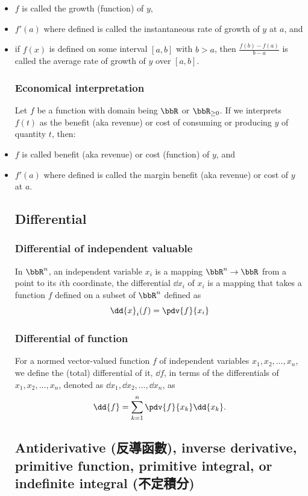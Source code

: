 \documentclass[a4paper,12pt]{report}
\begin{document}
\begin{itemize}
\begin{itemize}
\subsubsection{Biological interpretation}
Let $f$ be a function with domain being $\bbR$ or $\bbR_{\geq 0}$. If we interprets $f(t)$ as the number of some population $y$ at time $t$, then:
\bit
\item $f$ is called the growth (function) of $y$,
\item $f'(a)$ where defined is called the instantaneous rate of growth of $y$ at $a$, and
\item if $f(x)$ is defined on some interval $[a,b]$ with $b>a$, then $\frac{f(b)-f(a)}{b-a}$ is called the average rate of growth of $y$ over $[a,b]$.
\eit
\subsubsection{Economical interpretation}
Let $f$ be a function with domain being $\bbR$ or $\bbR_{\geq 0}$. If we interprets $f(t)$ as the benefit (aka revenue) or cost of consuming or producing $y$ of quantity $t$, then:
\bit
\item $f$ is called benefit (aka revenue) or cost (function) of $y$, and
\item $f'(a)$ where defined is called the margin benefit (aka revenue) or cost of $y$ at $a$.
\eit
\subsection{Differential}
\subsubsection{Differential of independent valuable}
In $\bbR^n$, an independent variable $x_i$ is a mapping $\bbR^n\to\bbR$ from a point to its $i$th coordinate, the differential $\dd{x}_i$ of $x_i$ is a mapping that takes a function $f$ defined on a subset of $\bbR^n$ defined as
\[\dd{x}_i(f)=\pdv{f}{x_i}\]
\subsubsection{Differential of function}
For a normed vector-valued function $f$ of independent variables $x_1,x_2,\ldots,x_n$, we define the (total) differential of it, $\dd{f}$, in terms of the differentials of $x_1,x_2,\ldots,x_n$, denoted as $\dd{x_1},\dd{x_2},\ldots,\dd{x_n}$, as
\[\dd{f}=\sum_{k=1}^n\pdv{f}{x_k}\dd{x_k}.\]
\subsection{Antiderivative (反導函數), inverse derivative, primitive function, primitive integral, or indefinite integral (不定積分)}

\end{itemize}
\end{itemize}
\end{document}
